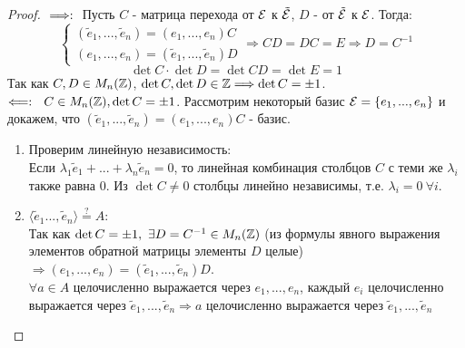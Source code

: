 \begin{proof}
    $ \\ \Longrightarrow: \ \ $Пусть $C$ - матрица перехода от $\mathcal{E}$ к $\tilde{\mathcal{E}}$, $D$ - от $\tilde{\mathcal{E}}$ к $\mathcal{E}$. Тогда:
    \[\begin{cases}
        (\tilde{e}_1,...,\tilde{e}_n) = (e_1,...,e_n)C\\
        (e_1,...,e_n) = (\tilde{e}_1,...,\tilde{e}_n)D
    \end{cases} \Longrightarrow CD = DC = E \Longrightarrow D = C^{-1}\]
    \[\det C \cdot \det D = \det CD = \det E = 1\]
    Так как $C, D \in M_n(\mathbb{Z})$, $\det C,\det D \in \mathbb{Z} \Longrightarrow \det C = \pm 1$. \\
    $\Longleftarrow: \ \ C \in M_n(\mathbb{Z}), \det C = \pm1$. Рассмотрим некоторый базис $\mathcal{E} = \{e_1,...,e_n\}$ и докажем, что $(\tilde{e}_1,...,\tilde{e}_n) = (e_1,...,e_n)C$ - базис.
    \begin{enumerate}
        \item Проверим линейную независимость:\\
        Если $\lambda_1\tilde{e}_1 + ... + \lambda_n\tilde{e}_n = 0$, то линейная комбинация столбцов $C$ с теми же $\lambda_i$ также равна 0. Из $\det C \neq 0$ столбцы линейно независимы, т.е. $\lambda_i = 0 \ \forall i$.
        \item $\langle \tilde{e}_1...,\tilde{e}_n \rangle \overset{?}{=} A$:\\
        Так как $\det C = \pm 1, \ \exists D = C^{-1} \in M_n(\mathbb{Z})$ (из формулы явного выражения элементов обратной матрицы элементы $D$ целые) $\Longrightarrow (e_1,...,e_n) = (\tilde{e}_1,...,\tilde{e}_n)D$.\\
        $\forall a \in A$ целочисленно выражается через $e_1,...,e_n$, каждый $e_i$ целочисленно выражается через $\tilde{e}_1,...,\tilde{e}_n \Longrightarrow a$ целочисленно выражается через $\tilde{e}_1,...,\tilde{e}_n$
    \end{enumerate}
\end{proof}
